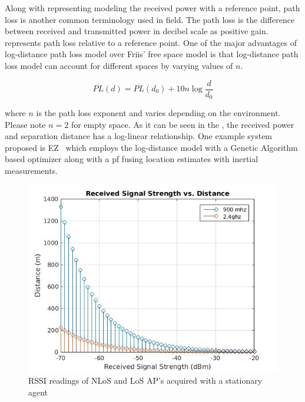     Along with representing modeling the received power with a reference point, path loss is another common terminology used in field.
    The path loss is the difference between received and transmitted power in decibel scale as positive gain.
     represents path loss relative to a reference point.
    One of the major advantages of log-distance path loss model over Friis' free space model is that log-distance path loss model can account for different spaces by varying values of $n$.

    \begin{equation}
        \label{eq:log-distance}
        \overline{PL}(d) = \overline{PL}(d_0) + 10 n \log{\dfrac{d}{d_0}}
    \end{equation}

    \noindent where $n$ is the path loss exponent and varies depending on the environment.
    Please note $n = 2$ for empty space.
    As it can be seen in the , the received power and separation distance has a log-linear relationship.
    One example system proposed is EZ~\cite{chintalapudi2010indoor} which employs the log-distance model with a Genetic Algorithm based optimizer along with a \gls{pf} fusing location estimates with inertial measurements.
    \begin{figure}[thpb]
       \centering
       \includegraphics[width=\linewidth]{figures/rss-vs-distance.jpg}
       \caption{\label{fig:log-distance}RSSI readings of NLoS and LoS AP's acquired with a stationary agent}
    \end{figure}

